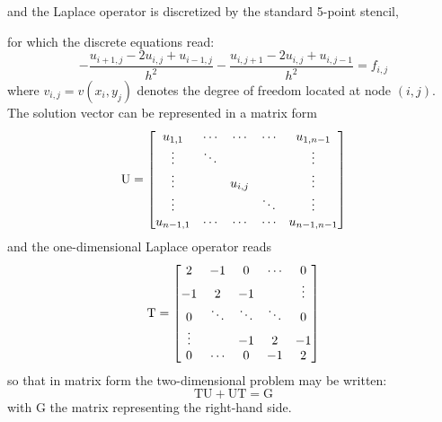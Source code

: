\documentclass[onecolumn, oneside, a4paper, 11pt]{memoir}
\theoremstyle{remark}
\newcommand{\mG}{{\mathrm G}}
\newcommand{\mT}{{\mathrm T}}
\newcommand{\mU}{{\mathrm U}}
\begin{document}
\begin{center}
\end{center}
and the Laplace operator is discretized by the standard 5-point stencil,
\begin{center}
\end{center}
for which the discrete equations read:
\begin{equation}
- \frac{u_{i+1,j} - 2 u_{i,j} + u_{i-1,j}}{h^2} - \frac{u_{i,j+1} - 2 u_{i,j} + u_{i,j-1}}{h^2} = f_{i,j}
\end{equation}
where $v_{i,j} = v(x_i,y_j)$ denotes the degree of freedom located at node $(i,j)$.
The solution vector can be represented in a matrix form
\[
\mU =
\begin{bmatrix}
u_{1,1}   & \cdots   &  \cdots    & \cdots   & u_{1, n-1}   \\
\vdots    & \ddots   &  \hfill    & \hfill   & \vdots       \\
\vdots    & \hfill   &  u_{i,j}   & \hfill   & \vdots       \\
\vdots    & \hfill   &  \hfill    & \ddots   & \vdots       \\
u_{n-1,1} & \cdots   &  \cdots    & \cdots   & u_{n-1, n-1} \\
\end{bmatrix}
\]
and the one-dimensional Laplace operator reads
\[
\mT = 
\begin{bmatrix}
2         & -1     &  0    & \cdots     & 0  \\
-1        &  2     &  -1    & \hfill    & \vdots       \\
0         & \ddots &  \ddots    & \ddots &  0       \\
\vdots    & \hfill &  -1     &  2   & -1       \\
0         & \cdots   &  0    & -1   & 2 \\
\end{bmatrix}
\]
so that in matrix form the two-dimensional problem may be written:
\begin{equation}
\mT\mU + \mU\mT = \mG
\end{equation}
with $\mG$ the matrix representing the right-hand side.
\end{document}
